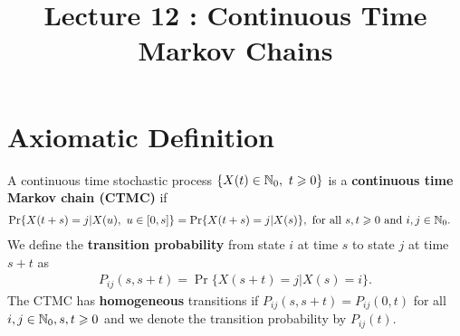 \documentclass[a4paper,10pt,english]{article}
\title{Lecture 12 : Continuous Time Markov Chains}
\author{}
\begin{document}
\maketitle

\section{Axiomatic Definition}
\begin{defn}
A continuous time stochastic process $\{X(t) \in \mathbb{N}_0,~ t \geqslant 0\}$ is a \textbf{continuous time Markov chain (CTMC)} if
\begin{align*}
\Pr\{X(t+s) = j |X(u),~ u \in [0,s]\} &= \Pr\{X(t+s) = j |X(s)\}, \text{ for all } s, t \geqslant 0 \text{ and } i, j \in \mathbb{N}_0.
\end{align*}
We define the \textbf{transition probability} from state $i$ at time $s$ to state $j$ at time $s+t$ as 
\begin{align*}
P_{ij}(s, s+t) = \Pr\{X(s+t) = j | X(s) = i\}.
\end{align*}
The CTMC has \textbf{homogeneous} transitions if $P_{ij}(s,s+t) = P_{ij}(0,t)$ for all $i,j \in \mathbb{N}_0, s,t \geqslant 0$ and we denote the transition probability by $P_{ij}(t)$. 
\end{defn}
\end{document}
